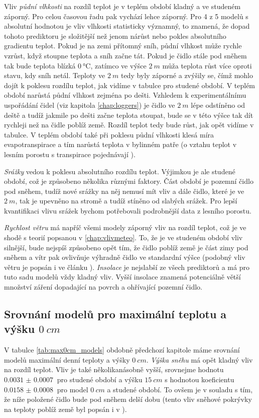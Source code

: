 Vliv \textit{půdní vlhkosti} na rozdíl teplot je v teplém období kladný a ve studeném záporný. Pro celou časovou řadu pak vychází lehce záporný. Pro 4 z 5 modelů s absolutní hodnotou je vliv vlhkosti statisticky významný, to znamená, že dopad tohoto prediktoru je složitější než jenom nárůst nebo pokles absolutního gradientu teplot. Pokud je na zemi přítomný sníh, půdní vlhkost může rychle vzrůst, když stoupne teplota a sníh začne tát. Pokud je čidlo stále pod sněhem tak bude teplota blízká $\SI{0}{\celsius}$, zatímco ve výšce $\SI{2}{m}$ můža teplota růst více oproti stavu, kdy sníh netál. Teploty ve $\SI{2}{m}$ tedy byly záporné a zvýšily se, čímž mohlo dojít k poklesu rozdílu teplot, jak vidíme v tabulce pro studené období. V teplém období narůstá půdní vlhkost zejména po dešti. Vzhledem k experimentálnímu uspořádání čidel (viz kapitola \ref{chap:loggers}) je čidlo ve $\SI{2}{m}$ lépe odstíněno od deště a tudíž jakmile po dešti začne teplota stoupat, bude se v této výšce tak dít rychleji než na čidle poblíž země. Rozdíl teplot tedy bude růst, jak opět vidíme v tabulce. V teplém období také při poklesu půdní vlhkosti klesá míra evapotranspirace a tím narůstá teplota v bylinném patře (o vztahu teplot v lesním porostu s transpirace pojednávají \cite{snow_deFrenneForestMicroclimates}).

\textit{Srážky} vedou k poklesu absolutního rozdílu teplot. Výjimkou je ale studené období, což je způsobeno několika různými faktory. Část období je pozemní čidlo pod sněhem, tudíž nové srážky na něj nemusí mít vliv a dále čidlo, které je ve $\SI{2}{m}$, tak je upevněno na stromě a tudíž stíněno od slabých srážek. Pro lepší kvantifikaci vlivu srážek bychom potřebovali podrobnější data z lesního porostu.

\textit{Rychlost větru} má napříč všemi modely záporný vliv na rozdíl teplot, což je ve shodě s teorií popsanou v \ref{chap:vlivmeteo}. To, že je ve studeném období vliv silnější, bude nejspíš způsobeno opět tím, že čidlo poblíž země je část zimy pod sněhem a vítr pak ovlivňuje výhradně čidlo ve standardní výšce (podobný vliv větru je popsán i ve článku \cite{wind_contrastingmicroclimates}). \textit{Insolace} je nejslabší ze všech prediktorů a má pro tuto sadu modelů vždy kladný vliv. Vyšší insolace znamená potenciálně větší množství záření dopadající na povrch a ohřívající pozemní čidlo.

\subsection{Srovnání modelů pro maximální teplotu a výšku $\SI{0}{cm}$}
V tabulce \ref{tab:max0cm_models} obdobně předchozí kapitole máme srovnání modelů maximální denní teploty a výšky $\SI{0}{cm}$. \textit{Výška sněhu} má opět kladný vliv na rozdíl teplot. Vliv je také několikanásobně vyšší, srovnejme hodnotu $\SI{0.0031(7)}{}$ pro studené období a výšku $\SI{15}{cm}$ s hodnotou koeficientu $\SI{0.0158(8)}{}$ pro model $\SI{0}{cm}$ a studené období. To ovšem je v souladu s tím, že níže položené čidlo bude pod sněhem delší dobu (tento vliv sněhové pokrývky na teploty poblíž země byl popsán i v \cite{snow_deFrenneForestMicroclimates}).

